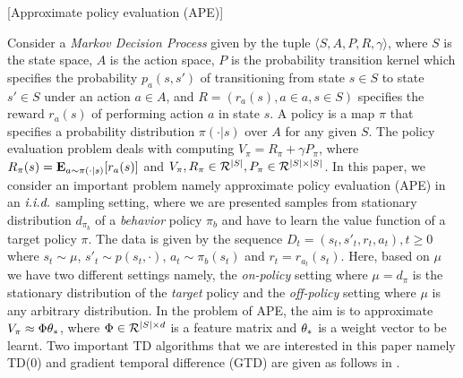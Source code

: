 \begin{example}\label{ex:ape}[Approximate policy evaluation (APE)]
\begin{comment}
We consider Markov decision processes (MDPs) with finite state space $S$ and action space $A$. Under a policy $\pi$ a MDP is a Markov chain with probability transition kernel $P_\pi=(p_\pi(s,\cdot),s\in S)$ which specifies the probability distributions over next state for given state $s$. The data is presented as $D_t=(s_t,s'_t,r_t)$, where $s_t\sim \iid \mu$ and $s'_t\sim p_{\pi}$ and $r_t=R_{a_t}(s_t)$, where $a_t\sim \pi_b(s,\cdot)$ and $R: S\times A\ra \R$. Here, based on $\mu$ we have two different settings namely, the \emph{on-policy} setting where $\mu=d_{\pi}$ is the stationary distribution of  the \emph{target} policy and the \emph{off-policy} setting where $\mu$ is any arbitrary distribution. 
The problem of approximate policy evaluation (APE) of policy $\pi$ involves learning the value function $V_\pi \in \R^{|S|}$. Typically $S$ is large and hence $V_\pi$ is approximated as $V_\pi\approx\Phi\ts$, where $\Phi$ is a $|S|\times d$ matrix and $\ts\in\R^d$ needs to be learnt from data. \Cref{tb:tdalgos}specifies two important algorithms to solve APE namely TD(0) and GTD, where $\phi_t=\Phi(s_t,\cdot)\in \R^d$ and $\phi'_t=\Phi(s'_t,\cdot)\R^d$ are the ${s_t,s'_t}^{th}$ rows of the feature matrix $\Phi$. 
\end{comment}
Consider a \emph{Markov Decision Process} given by the tuple $\langle S,A,P,R,\gamma \rangle$, where $S$ is the state space, $A$ is the action space, $P$ is the probability transition kernel which specifies the probability $p_a(s,s')$ of transitioning from state $s\in S$ to state $s'\in S$ under an action $a\in A$, and $R=(r_a(s),a\in a,s\in S)$ specifies the reward $r_a(s)$ of performing action $a$ in state $s$. A policy is a map $\pi$ that specifies a probability distribution $\pi(\cdot | s)$ over $A$ for any given $S$. The policy evaluation problem deals with computing $V_\pi=R_\pi+\gamma P_\pi$, where $R_\pi(s)=\mathbf{E}_{a\sim \pi(\cdot|s)}[r_a(s)]$ and $V_\pi,R_\pi \in \mathcal{R}^{|S|},P_\pi\in\mathcal{R}^{|S|\times|S|}$. 
In this paper, we consider an important problem namely approximate policy evaluation (APE) in an $\emph{i.i.d.}$ sampling setting, where we are presented samples from stationary distribution $d_{\pi_b}$ of a \emph{behavior} policy $\pi_b$ and have to learn the value function of a target policy $\pi$. The data is given by the sequence  $D_t=(s_t,s'_t,r_t,a_t),t\geq 0$ where $s_t\sim \mu$,  $s'_t\sim p(s_t,\cdot)$, $a_t\sim\pi_b(s_t)$ and $r_t=r_{a_t}(s_t)$. Here, based on $\mu$ we have two different settings namely, the \emph{on-policy} setting where $\mu=d_{\pi}$ is the stationary distribution of  the \emph{target} policy and the \emph{off-policy} setting where $\mu$ is any arbitrary distribution. In the problem of APE, the aim is to approximate $V_\pi \approx \Phi \theta_*$, where $\Phi\in \mathcal{R}^{|S|\times d}$ is a feature matrix and $\theta_*$ is a weight vector to be learnt. Two important TD algorithms that we are interested in this paper namely  TD(0) and gradient temporal difference (GTD) are given as follows in .


\end{example}
